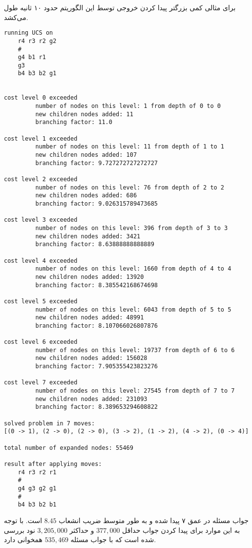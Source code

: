 \documentclass{article}
\begin{document}
برای مثالی کمی بزرگتر پیدا کردن خروجی توسط این الگوریتم حدود ۱۰ ثانیه طول می‌کشد.
\begin{latin}
\begin{lstlisting}
running UCS on 
	r4 r3 r2 g2
	#
	g4 b1 r1
	g3
	b4 b3 b2 g1


cost level 0 exceeded
         number of nodes on this level: 1 from depth of 0 to 0
         new children nodes added: 11
         branching factor: 11.0

cost level 1 exceeded
         number of nodes on this level: 11 from depth of 1 to 1
         new children nodes added: 107
         branching factor: 9.727272727272727

cost level 2 exceeded
         number of nodes on this level: 76 from depth of 2 to 2
         new children nodes added: 686
         branching factor: 9.026315789473685

cost level 3 exceeded
         number of nodes on this level: 396 from depth of 3 to 3
         new children nodes added: 3421
         branching factor: 8.63888888888889

cost level 4 exceeded
         number of nodes on this level: 1660 from depth of 4 to 4
         new children nodes added: 13920
         branching factor: 8.385542168674698

cost level 5 exceeded
         number of nodes on this level: 6043 from depth of 5 to 5
         new children nodes added: 48991
         branching factor: 8.107066026807876

cost level 6 exceeded
         number of nodes on this level: 19737 from depth of 6 to 6
         new children nodes added: 156028
         branching factor: 7.905355423823276

cost level 7 exceeded
         number of nodes on this level: 27545 from depth of 7 to 7
         new children nodes added: 231093
         branching factor: 8.389653294608822

solved problem in 7 moves:
[(0 -> 1), (2 -> 0), (2 -> 0), (3 -> 2), (1 -> 2), (4 -> 2), (0 -> 4)]

total number of expanded nodes: 55469

result after applying moves:
	r4 r3 r2 r1
	#
	g4 g3 g2 g1
	#
	b4 b3 b2 b1
\end{lstlisting}
\end{latin}

جواب مسئله در عمق ۷ پیدا شده و به طور متوسط ضریب انشعاب $8.45$ است. با توجه به این موارد برای پیدا کردن جواب حداقل $377,000$ و حداکثر $3,205,000$ نود بررسی شده است که با جواب مسئله $535,469$ همخوانی دارد.
\end{document}
